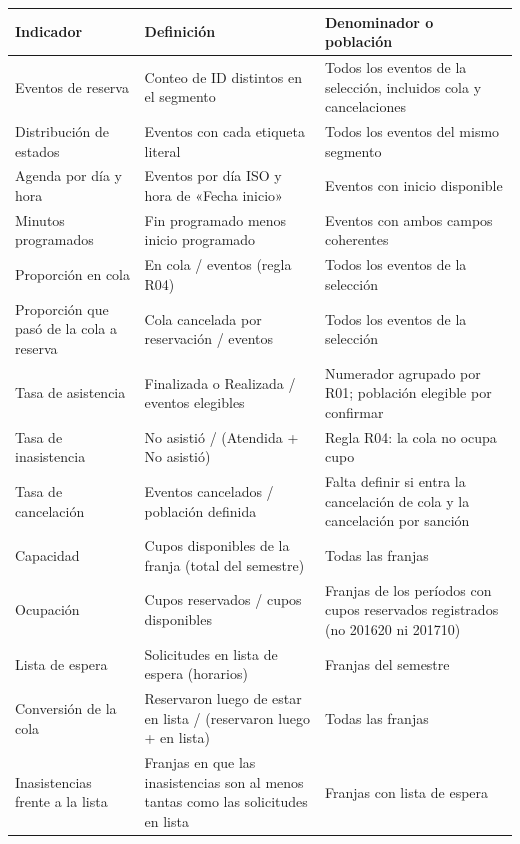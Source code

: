 \documentclass[11pt,letterpaper]{article}
\begin{document}
\begingroup\small\setlength{\tabcolsep}{4pt}\renewcommand{\arraystretch}{1.15}
\begin{longtable}{>{\raggedright\arraybackslash}p{}>{\raggedright\arraybackslash}p{}>{\raggedright\arraybackslash}p{}}
\toprule
\textbf{Indicador} & \textbf{Definición} & \textbf{Denominador o población} \\
\midrule
\endhead
Eventos de reserva & Conteo de ID distintos en el segmento & Todos los eventos de la selección, incluidos cola y cancelaciones \\
Distribución de estados & Eventos con cada etiqueta literal & Todos los eventos del mismo segmento \\
Agenda por día y hora & Eventos por día ISO y hora de «Fecha inicio» & Eventos con inicio disponible \\
Minutos programados & Fin programado menos inicio programado & Eventos con ambos campos coherentes \\
Proporción en cola & En cola / eventos (regla R04) & Todos los eventos de la selección \\
Proporción que pasó de la cola a reserva & Cola cancelada por reservación / eventos & Todos los eventos de la selección \\
Tasa de asistencia & Finalizada o Realizada / eventos elegibles & Numerador agrupado por R01; población elegible por confirmar \\
Tasa de inasistencia & No asistió / (Atendida + No asistió) & Regla R04: la cola no ocupa cupo \\
Tasa de cancelación & Eventos cancelados / población definida & Falta definir si entra la cancelación de cola y la cancelación por sanción \\
Capacidad & Cupos disponibles de la franja (total del semestre) & Todas las franjas \\
Ocupación & Cupos reservados / cupos disponibles & Franjas de los períodos con cupos reservados registrados (no 201620 ni 201710) \\
Lista de espera & Solicitudes en lista de espera (horarios) & Franjas del semestre \\
Conversión de la cola & Reservaron luego de estar en lista / (reservaron luego + en lista) & Todas las franjas \\
Inasistencias frente a la lista & Franjas en que las inasistencias son al menos tantas como las solicitudes en lista & Franjas con lista de espera \\
\bottomrule
\end{longtable}
\endgroup
\end{document}
